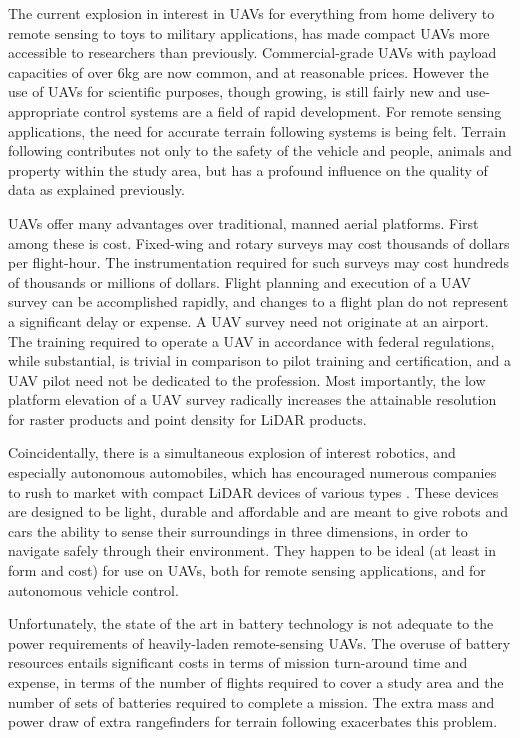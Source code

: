 \documentclass[10pt]{article}
\begin{document}
The current explosion in interest in UAVs for everything from home delivery to remote sensing to toys to military applications, has made compact UAVs more accessible to researchers than previously. Commercial-grade UAVs with payload capacities of over 6kg are now common, and at reasonable prices. However the use of UAVs for scientific purposes, though growing, is still fairly new and use-appropriate control systems are a field of rapid development. For remote sensing applications, the need for accurate terrain following systems is being felt. Terrain following contributes not only to the safety of the vehicle and people, animals and property within the study area, but has a profound influence on the quality of data as explained previously.

UAVs offer many advantages over traditional, manned aerial platforms. First among these is cost. Fixed-wing and rotary surveys may cost thousands of dollars per flight-hour. The instrumentation required for such surveys may cost hundreds of thousands or millions  of dollars. Flight planning and execution of a UAV survey can be accomplished rapidly, and changes to a flight plan do not represent a significant delay or expense. A UAV survey need not originate at an airport. The training required to operate a UAV in accordance with federal regulations, while substantial, is trivial in comparison to pilot training and certification, and a UAV pilot need not be dedicated to the profession. Most importantly, the low platform elevation of a UAV survey radically increases the attainable resolution for raster products and point density for LiDAR products.

Coincidentally, there is a simultaneous explosion of interest robotics, and especially autonomous automobiles, which has encouraged numerous companies to rush to market with compact LiDAR devices of various types \cite{Quanergy2017,Dormehl2017,Morin2017}. These devices are designed to be light, durable and affordable and are meant to give robots and cars the ability to sense their surroundings in three dimensions, in order to navigate safely through their environment. They happen to be ideal (at least in form and cost) for use on UAVs, both for remote sensing applications, and for autonomous vehicle control.

Unfortunately, the state of the art in battery technology is not adequate to the power requirements of heavily-laden remote-sensing UAVs. The overuse of battery resources entails significant costs in terms of mission turn-around time and expense, in terms of the number of flights required to cover a study area and the number of sets of batteries required to complete a mission. The extra mass and power draw of extra rangefinders for terrain following exacerbates this problem.
\end{document}
